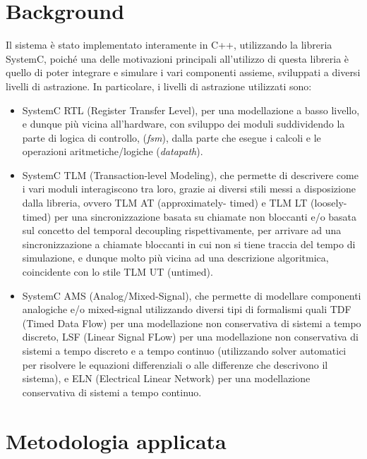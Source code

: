 \documentclass[]{IEEEtran}
\begin{document}
\section{Background}
Il sistema \`e stato implementato interamente in C++, utilizzando la libreria SystemC, poich\'e una delle motivazioni 
principali all'utilizzo di questa libreria \`e quello di poter integrare e simulare i vari componenti assieme, sviluppati 
a diversi livelli di astrazione. In particolare, i livelli di astrazione utilizzati sono:
\begin{itemize}
    \item SystemC RTL\cite{RTL} (Register Transfer Level), per una modellazione a basso livello, e dunque pi\`u vicina 
    all'hardware, con sviluppo dei moduli suddividendo la parte di logica di controllo, (\textit{fsm}), dalla parte che 
    esegue i calcoli e le operazioni aritmetiche/logiche (\textit{datapath}).
    
    \item SystemC\cite{SystemC} TLM (Transaction-level Modeling), che permette di descrivere come i vari moduli 
    interagiscono tra loro, grazie ai diversi stili messi a disposizione dalla libreria, ovvero TLM AT (approximately-
    timed) e TLM LT (loosely-timed) per una sincronizzazione basata su chiamate non bloccanti e/o basata sul concetto 
    del temporal decoupling rispettivamente, per arrivare ad una sincronizzazione a chiamate bloccanti in cui non si 
    tiene traccia del tempo di simulazione, e dunque molto pi\`u vicina ad una descrizione algoritmica, coincidente con 
    lo stile TLM UT (untimed).
    
    \item SystemC AMS\cite{AMS} (Analog/Mixed-Signal), che permette di modellare componenti analogiche e/o mixed-signal 
    utilizzando diversi tipi di formalismi quali TDF (Timed Data Flow) per una modellazione non conservativa di sistemi 
    a tempo discreto, LSF (Linear Signal FLow) per una modellazione non conservativa di sistemi a tempo discreto e a 
    tempo continuo (utilizzando solver automatici per risolvere le equazioni differenziali o alle differenze che 
    descrivono il sistema), e ELN (Electrical Linear Network) per una modellazione conservativa di sistemi a tempo 
    continuo.
\end{itemize}

\section{Metodologia applicata}
\end{document}
